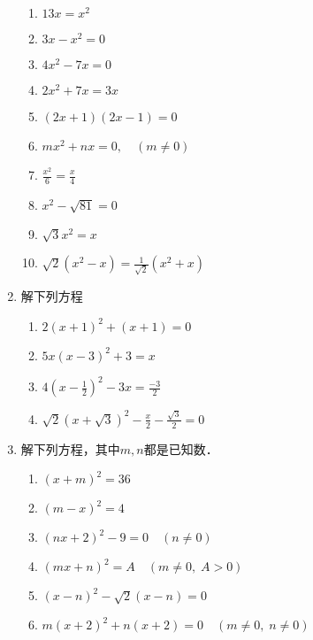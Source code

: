 \begin{enumerate}
\begin{multicols}{2}
\begin{enumerate}
    \item $13 x=x^{2}$
    \item $3 x-x^{2}=0$
    \item $4 x^{2}-7 x=0$
    \item $2 x^{2}+7 x=3 x$
    \item $(2 x+1)(2 x-1)=0$
    \item $ m x^{2}+n x=0,\quad (m \neq 0)$
    \item $\frac{x^{2}}{6}=\frac{x}{4}$
    \item  $x^{2}-\sqrt{81}=0$
    \item  $\sqrt{3} x^{2}=x$
    \item $\sqrt{2}\left(x^{2}-x\right)=\frac{1}{\sqrt{2}}\left(x^{2}+x\right)$
        \end{enumerate}
    \end{multicols}
    \item 解下列方程
    \begin{multicols}{2}
        \begin{enumerate}
    \item $2(x+1)^{2}+(x+1)=0$ 
    \item  $5 x(x-3)^{2}+3=x$
    \item  $4\left(x-\frac{1}{2}\right)^{2}-3 x=\frac{-3}{2}$
    \item  $\sqrt{2}(x+\sqrt{3})^{2}-\frac{x}{2}-\frac{\sqrt{3}}{2}=0$
        \end{enumerate}
    \end{multicols}
    \item 解下列方程，其中$m,n$都是已知数．
        \begin{enumerate}
\item $(x+m)^2=36$
\item $(m-x)^2=4$
\item $(nx+2)^2-9=0\quad  (n\ne 0)$
\item $(mx+n)^2=A\quad  (m\ne 0,\; A>0)$
\item $(x-n)^2-\sqrt{2}(x-n)=0$
\item  $m(x+2)^2+n(x+2)=0\quad  (m\ne 0,\; n\ne 0)$
        \end{enumerate}


\end{enumerate}
